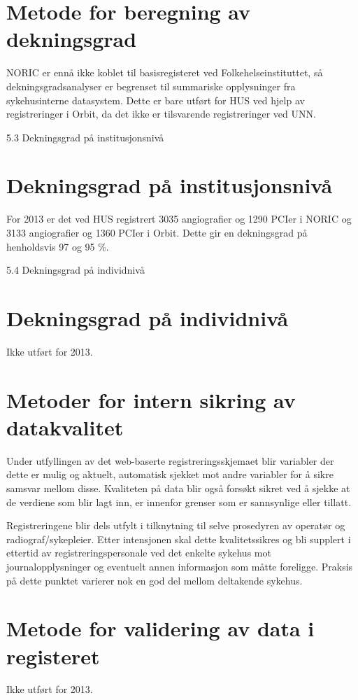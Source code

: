 \documentclass[norsk, a4paper]{report}
\begin{document}
\section{Metode for beregning av dekningsgrad}\label{sec:met}
NORIC er ennå ikke koblet til basisregisteret ved Folkehelseinstituttet, så dekningsgradsanalyser er begrenset til summariske opplysninger fra sykehusinterne datasystem. Dette er bare utført for HUS ved hjelp av registreringer i Orbit, da det ikke er tilsvarende registreringer ved UNN. 

5.3 Dekningsgrad på institusjonsnivå
\section{Dekningsgrad på institusjonsnivå}\label{sec:endek}
For 2013 er det ved HUS registrert 3035 angiografier og 1290 PCIer i NORIC og 3133 angiografier og 1360 PCIer  i Orbit. Dette gir en dekningsgrad på henholdsvis 97 og 95 \%.

5.4 Dekningsgrad på individnivå
\section{Dekningsgrad på individnivå}\label{sec:obs}
Ikke utført for 2013.

\section{Metoder for intern sikring av datakvalitet}\label{sec:sik}
Under utfyllingen av det web-baserte registreringsskjemaet blir variabler der dette er mulig og aktuelt, automatisk sjekket mot andre variabler for å sikre samsvar mellom disse. Kvaliteten på data blir også forsøkt sikret ved å sjekke at de verdiene som blir lagt inn, er innenfor grenser som er sannsynlige eller tillatt. 

Registreringene blir dels utfylt i tilknytning til selve prosedyren av operatør og radiograf/sykepleier. Etter intensjonen skal dette kvalitetssikres og bli supplert i ettertid av registreringspersonale ved det enkelte sykehus mot journalopplysninger og eventuelt annen informasjon som måtte foreligge. Praksis på dette punktet varierer nok en god del mellom deltakende sykehus.

\section{Metode for validering av data i registeret}\label{sec:metval}
Ikke utført for 2013.
\end{document}
